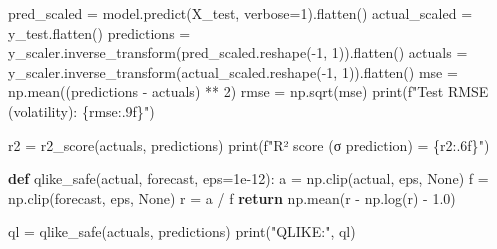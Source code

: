 \documentclass[
  letterpaper,
  DIV=11,
  numbers=noendperiod]{scrartcl}
\newenvironment{Shaded}{\begin{snugshade}}{\end{snugshade}}
\newcommand{\BuiltInTok}[1]{\textcolor[rgb]{0.00,0.23,0.31}{#1}}
\newcommand{\ControlFlowTok}[1]{\textcolor[rgb]{0.00,0.23,0.31}{\textbf{#1}}}
\newcommand{\DecValTok}[1]{\textcolor[rgb]{0.68,0.00,0.00}{#1}}
\newcommand{\FloatTok}[1]{\textcolor[rgb]{0.68,0.00,0.00}{#1}}
\newcommand{\KeywordTok}[1]{\textcolor[rgb]{0.00,0.23,0.31}{\textbf{#1}}}
\newcommand{\NormalTok}[1]{\textcolor[rgb]{0.00,0.23,0.31}{#1}}
\newcommand{\OperatorTok}[1]{\textcolor[rgb]{0.37,0.37,0.37}{#1}}
\newcommand{\SpecialCharTok}[1]{\textcolor[rgb]{0.37,0.37,0.37}{#1}}
\newcommand{\SpecialStringTok}[1]{\textcolor[rgb]{0.13,0.47,0.30}{#1}}
\newcommand{\StringTok}[1]{\textcolor[rgb]{0.13,0.47,0.30}{#1}}
\newcommand{\VariableTok}[1]{\textcolor[rgb]{0.07,0.07,0.07}{#1}}
\begin{document}
\begin{Shaded}
\begin{Highlighting}[]
\NormalTok{pred\_scaled }\OperatorTok{=}\NormalTok{ model.predict(X\_test, verbose}\OperatorTok{=}\DecValTok{1}\NormalTok{).flatten()}
\NormalTok{actual\_scaled }\OperatorTok{=}\NormalTok{ y\_test.flatten()}
\NormalTok{predictions }\OperatorTok{=}\NormalTok{ y\_scaler.inverse\_transform(pred\_scaled.reshape(}\OperatorTok{{-}}\DecValTok{1}\NormalTok{, }\DecValTok{1}\NormalTok{)).flatten()}
\NormalTok{actuals     }\OperatorTok{=}\NormalTok{ y\_scaler.inverse\_transform(actual\_scaled.reshape(}\OperatorTok{{-}}\DecValTok{1}\NormalTok{, }\DecValTok{1}\NormalTok{)).flatten()}
\NormalTok{mse   }\OperatorTok{=}\NormalTok{ np.mean((predictions }\OperatorTok{{-}}\NormalTok{ actuals) }\OperatorTok{**} \DecValTok{2}\NormalTok{)}
\NormalTok{rmse  }\OperatorTok{=}\NormalTok{ np.sqrt(mse)}
\BuiltInTok{print}\NormalTok{(}\SpecialStringTok{f"Test RMSE (volatility): }\SpecialCharTok{\{}\NormalTok{rmse}\SpecialCharTok{:.9f\}}\SpecialStringTok{"}\NormalTok{)}
\end{Highlighting}
\end{Shaded}

\begin{Shaded}
\begin{Highlighting}[]
\NormalTok{r2 }\OperatorTok{=}\NormalTok{ r2\_score(actuals, predictions)}
\BuiltInTok{print}\NormalTok{(}\SpecialStringTok{f"R² score (σ prediction) = }\SpecialCharTok{\{}\NormalTok{r2}\SpecialCharTok{:.6f\}}\SpecialStringTok{"}\NormalTok{)}
\end{Highlighting}
\end{Shaded}

\begin{Shaded}
\begin{Highlighting}[]
\KeywordTok{def}\NormalTok{ qlike\_safe(actual, forecast, eps}\OperatorTok{=}\FloatTok{1e{-}12}\NormalTok{):}
\NormalTok{    a }\OperatorTok{=}\NormalTok{ np.clip(actual,   eps, }\VariableTok{None}\NormalTok{)}
\NormalTok{    f }\OperatorTok{=}\NormalTok{ np.clip(forecast, eps, }\VariableTok{None}\NormalTok{)}
\NormalTok{    r }\OperatorTok{=}\NormalTok{ a }\OperatorTok{/}\NormalTok{ f}
    \ControlFlowTok{return}\NormalTok{ np.mean(r }\OperatorTok{{-}}\NormalTok{ np.log(r) }\OperatorTok{{-}} \FloatTok{1.0}\NormalTok{)}

\NormalTok{ql }\OperatorTok{=}\NormalTok{ qlike\_safe(actuals, predictions)}
\BuiltInTok{print}\NormalTok{(}\StringTok{"QLIKE:"}\NormalTok{, ql)}
\end{Highlighting}
\end{Shaded}
\end{document}
